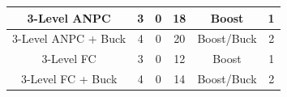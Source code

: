 \begin{table}
\begin{tabular}{c|c|c|c|c|c}
	\hline
	3-Level ANPC  & \cellcolor{yellow!25}3 & \cellcolor{green!25}0 & \cellcolor{red!25}18 & \cellcolor{red!25}Boost & \cellcolor{green!25}1 \\
	\hline
	3-Level ANPC + Buck & \cellcolor{yellow!25}4 &\cellcolor{green!25}0 & \cellcolor{red!25}20 & \cellcolor{green!25}Boost/Buck & \cellcolor{red!25}2 \\
	\hline
	3-Level FC & \cellcolor{yellow!25}3 & \cellcolor{green!25}0 & \cellcolor{yellow!25}12 & \cellcolor{red!25}Boost & \cellcolor{green!25}1 \\
	\hline
	3-Level FC + Buck & \cellcolor{yellow!25}4 &\cellcolor{green!25}0 & \cellcolor{yellow!25}14 &\cellcolor{green!25} Boost/Buck &\cellcolor{red!25}2 \\
\end{tabular}
\end{table}

